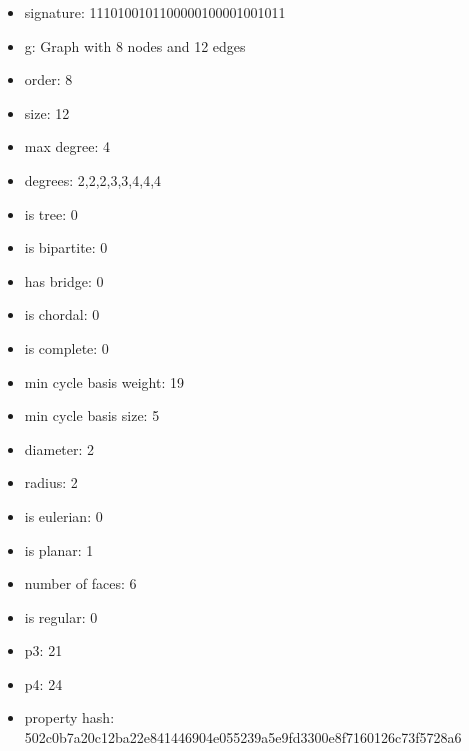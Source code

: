 \begin{itemize}
\item signature: 1110100101100000100001001011
\item g: Graph with 8 nodes and 12 edges
\item order: 8
\item size: 12
\item max degree: 4
\item degrees: 2,2,2,3,3,4,4,4
\item is tree: 0
\item is bipartite: 0
\item has bridge: 0
\item is chordal: 0
\item is complete: 0
\item min cycle basis weight: 19
\item min cycle basis size: 5
\item diameter: 2
\item radius: 2
\item is eulerian: 0
\item is planar: 1
\item number of faces: 6
\item is regular: 0
\item p3: 21
\item p4: 24
\item property hash: 502c0b7a20c12ba22e841446904e055239a5e9fd3300e8f7160126c73f5728a6
\end{itemize}
\newpage
\begin{figure}
\end{figure}

